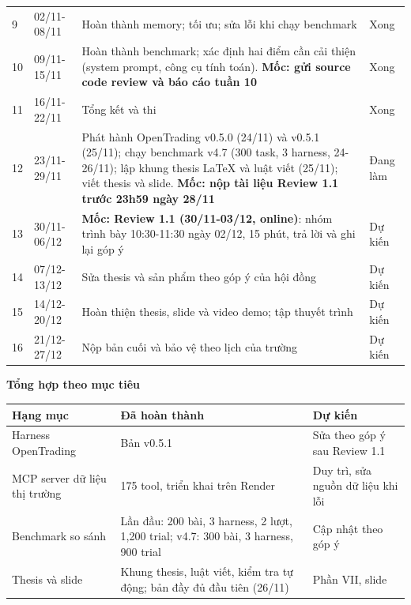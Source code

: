 \documentclass[10pt,a4paper]{article}
\newcommand\done{Xong}\newcommand\doing{Đang làm}\newcommand\plan{Dự kiến}
\begin{document}
\begin{longtable}{P{11mm}P{23mm}P{108mm}P{18mm}}
9 & 02/11-08/11 & Hoàn thành memory; tối ưu; sửa lỗi khi chạy benchmark & \done\\
10 & 09/11-15/11 & Hoàn thành benchmark; xác định hai điểm cần cải thiện (system prompt, công cụ tính toán). \textbf{Mốc: gửi source code review và báo cáo tuần 10} & \done\\
11 & 16/11-22/11 & Tổng kết và thi & \done\\
12 & 23/11-29/11 & Phát hành OpenTrading v0.5.0 (24/11) và v0.5.1 (25/11); chạy benchmark v4.7 (300 task, 3 harness, 24-26/11); lập khung thesis LaTeX và luật viết (25/11); viết thesis và slide. \textbf{Mốc: nộp tài liệu Review 1.1 trước 23h59 ngày 28/11} & \doing\\
13 & 30/11-06/12 & \textbf{Mốc: Review 1.1 (30/11-03/12, online)}: nhóm trình bày 10:30-11:30 ngày 02/12, 15 phút, trả lời và ghi lại góp ý & \plan\\
14 & 07/12-13/12 & Sửa thesis và sản phẩm theo góp ý của hội đồng & \plan\\
15 & 14/12-20/12 & Hoàn thiện thesis, slide và video demo; tập thuyết trình & \plan\\
16 & 21/12-27/12 & Nộp bản cuối và bảo vệ theo lịch của trường & \plan\\
\bottomrule
\end{longtable}

\normalsize\textbf{Tổng hợp theo mục tiêu}
\small
\begin{center}
\begin{tabular}{P{46mm}P{72mm}P{45mm}}
\toprule
{}\textbf{Hạng mục}&\textbf{Đã hoàn thành}&\textbf{Dự kiến}\\
\midrule
Harness OpenTrading & Bản v0.5.1 & Sửa theo góp ý sau Review 1.1\\
MCP server dữ liệu thị trường & 175 tool, triển khai trên Render & Duy trì, sửa nguồn dữ liệu khi lỗi\\
Benchmark so sánh & Lần đầu: 200 bài, 3 harness, 2 lượt, 1,200 trial; v4.7: 300 bài, 3 harness, 900 trial & Cập nhật theo góp ý\\
Thesis và slide & Khung thesis, luật viết, kiểm tra tự động; bản đầy đủ đầu tiên (26/11) & Phần VII, slide\\
\bottomrule
\end{tabular}
\end{center}
\end{document}
